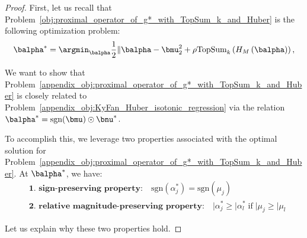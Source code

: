 \begin{proof}
First, let us recall that Problem~\eqref{obj:proximal_operator_of_g*_with_TopSum_k_and_Huber} is the following optimization problem:
\begin{align}
    \label{appendix_obj:proximal_operator_of_g*_with_TopSum_k_and_Huber}
    \balpha^* = \argmin_{\balpha} \frac{1}{2} \Vert{\balpha - \bmu}_2^2 + \rho \text{TopSum}_k\left( H_M\left( \balpha \right) \right),
\end{align}

We want to show that Problem~\eqref{appendix_obj:proximal_operator_of_g*_with_TopSum_k_and_Huber} is closely related to Problem~\eqref{appendix_obj:KyFan_Huber_isotonic_regression} via the relation $\balpha^* = \text{sgn}(\bmu) \odot \bnu^*$.


To accomplish this, we leverage two properties associated with the optimal solution for Problem~\eqref{appendix_obj:proximal_operator_of_g*_with_TopSum_k_and_Huber}.
At $\balpha^*$, we have:
\begin{align}
    & \textbf{1. sign-preserving property:} \quad \text{sgn}(\alpha_j^*) = \text{sgn}(\mu_j) \label{appendix_property:sign_preserving}\\
    & \textbf{2. relative magnitude-preserving property:} \quad \vert{\alpha_j^*} \geq \vert{\alpha_l^*} \; \text{if} \; \vert{\mu_j} \geq \vert{\mu_l} \label{appendix_property:relative_magnitude_preserving}
\end{align}

Let us explain why these two properties hold.


\end{proof}
